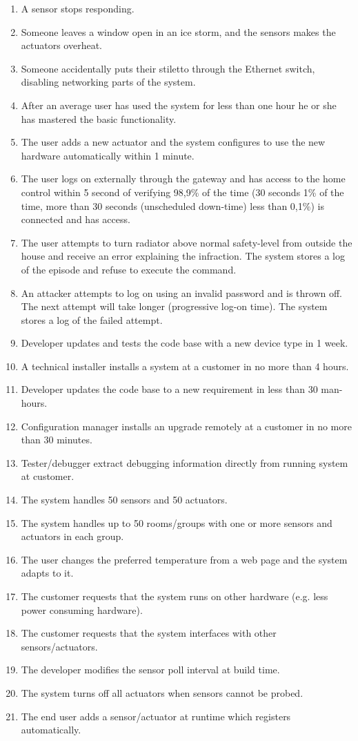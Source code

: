 \documentclass[a4paper,10pt]{article}
\begin{document}
\begin{enumerate}
\item A sensor stops responding.
\item Someone leaves a window open in an ice storm, and the sensors makes the actuators overheat.
\item Someone accidentally puts their stiletto through the Ethernet switch, disabling networking 
parts of the system.
\item After an average user has used the system for less than one hour he or she has mastered the basic functionality.
\item The user adds a new actuator and the system configures to use the new hardware automatically within 1 minute.
\item The user logs on externally through the gateway and has access to the home control within 5 second of verifying 98,9\% of the
time (30 seconds 1\% of the time, more than 30 seconds (unscheduled down-time) less than 0,1\%) is connected and has access.
\item The user attempts to turn radiator above normal safety-level from outside the house and receive an error explaining the infraction. The system stores a log of the episode and refuse to execute the command.
\item An attacker attempts to log on using an invalid password and is thrown off. The next attempt will take longer (progressive log-on time). The system stores a log of the failed attempt.
\item Developer updates and tests the code base with a new device type in 1 week.
\item A technical installer installs a system at a customer in no more than 4 hours.
\item Developer updates the code base to a new requirement in less than 30 man-hours.
\item Configuration manager installs an upgrade remotely at a customer in no more than 30 minutes.
\item Tester/debugger extract debugging information directly from running system at customer.
\item The system handles 50 sensors and 50 actuators.
\item The system handles up to 50 rooms/groups with one or more sensors and actuators in each group.
\item The user changes the preferred temperature from a web page and the system adapts to it.
\item The customer requests that the system runs on other hardware (e.g. less power consuming hardware).
\item The customer requests that the system interfaces with other sensors/actuators.
\item The developer modifies the sensor poll interval at build time.
\item The system turns off all actuators when sensors cannot be probed.
\item The end user adds a sensor/actuator at runtime which registers automatically.
\end{enumerate}
\end{document}

